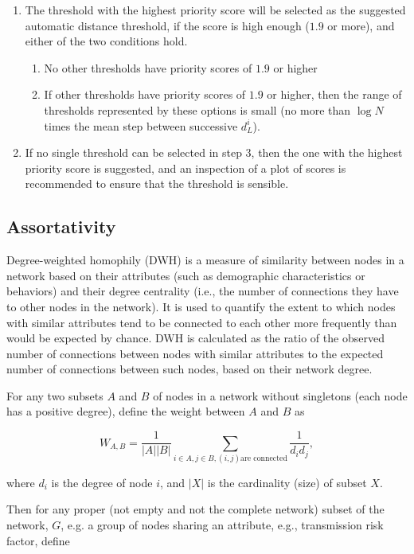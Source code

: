 \documentclass[utf8]{FrontiersinHarvard} %
\begin{document}
\begin{enumerate}
	\item{The threshold with the highest priority score will be selected as the suggested automatic distance threshold, if the score is high enough ($1.9$ or more), and either of the two conditions hold.
	            \begin{enumerate}
		            \item{No other thresholds have priority scores of $1.9$ or higher}
		            \item{If other thresholds have priority scores of $1.9$ or higher, then the range of thresholds represented by these options is small (no more than $\log N$ times the mean step between successive $d_L^i$).}
	            \end{enumerate}}

	\item{If no single threshold can be selected in step 3, then the one with the highest priority score is suggested, and an inspection of a plot of scores is recommended to ensure that the threshold is sensible.}
\end{enumerate}

\subsection{Assortativity}

Degree-weighted homophily (DWH) is a measure of similarity between nodes in a
network based on their attributes (such as demographic characteristics or
behaviors) and their degree centrality (i.e., the number of connections they have to other
nodes in the network). It is used to quantify the extent to which nodes with
similar attributes tend to be connected to each other more frequently than
would be expected by chance\cite{RePEc:adr:anecst:y:2012:i:107-108:p:33-48}.
DWH is calculated as the ratio of the observed number of connections between
nodes with similar attributes to the expected number of connections between
such nodes, based on their network degree.

For any two subsets $A$ and $B$ of nodes in a network without singletons (each
node has a positive degree), define the weight between $A$ and $B$ as

\[
	W_{A,B} = \frac{1}{|A||B|} \sum_{i \in A, j\in B, (i,j) \text{are connected}} \frac{1}{d_i d_j},
\]

where $d_i$ is the degree of node $i$, and $|X|$ is the cardinality (size) of
subset $X$.

Then for any proper (not empty and not the complete network) subset of the
network, $G$, e.g. a group of nodes sharing an attribute, e.g., transmission
risk factor, define
\end{document}
